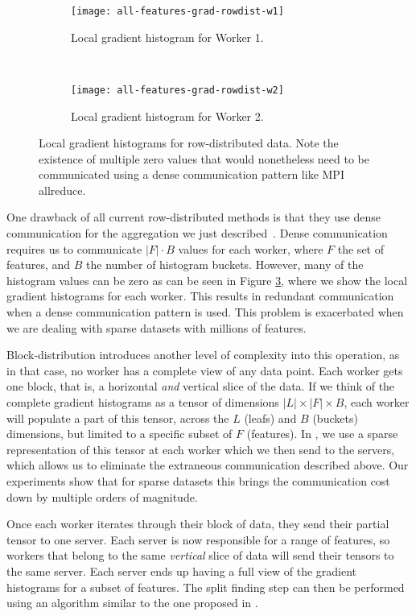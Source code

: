 \begin{figure}
	\centering
	\begin{subfigure}[t]{\textwidth}
		\centering
		\texttt{[image: all-features-grad-rowdist-w1]}
		\caption{Local gradient histogram for Worker 1.}
		\label{fig:grad-row-dist-w1}
	\end{subfigure}
	\\
	\begin{subfigure}[t]{\textwidth}
		\centering
		\texttt{[image: all-features-grad-rowdist-w2]}
		\caption{Local gradient histogram for Worker 2.}
		\label{fig:grad-row-dist-w2}
	\end{subfigure}
	\caption{Local gradient histograms for row-distributed data. Note the existence of multiple
	zero values that would nonetheless need to be communicated using a dense communication pattern like
	MPI allreduce.}
	\label{fig:grad-row-dist}
\end{figure}


One drawback of all current row-distributed methods is that they use dense communication
for the aggregation we just described~\cite{xgboost, lightgbm, catboost, dimboost}. Dense communication
requires us to communicate $|F| \cdot B$ values for each worker, where $F$ the set of features,
and $B$ the number of histogram buckets. However,
many of the histogram values can be zero as can be seen in Figure \ref{fig:grad-row-dist}, where we show
the local gradient histograms for each worker. This results in redundant communication when
a dense communication pattern is used. This problem is exacerbated when we are dealing with sparse
datasets with millions of features.

Block-distribution introduces another level of complexity into this operation, as
in that case, no worker has a complete view of any data point. Each worker gets one block,
that is, a horizontal \emph{and} vertical slice of the data. If we think of the complete
gradient histograms as a tensor of dimensions $|L| \times |F| \times B$, each worker
will populate a part of this tensor, across the $L$ (leafs) and $B$ (buckets) dimensions, but limited to a specific
subset of $F$ (features). In \blockgbt, we use a sparse representation of this tensor at each worker
which we then send to the servers, which allows
us to eliminate the extraneous communication described above. Our experiments show
that for sparse datasets this brings the communication cost down by multiple orders
of magnitude.

Once each worker iterates
through their block of data, they send their partial tensor to one server. Each server
is now responsible for a range of features, so workers that belong to the same \emph{vertical}
slice of data will send their tensors to the same server. Each server ends up having
a full view of the gradient histograms for a subset of features. The split finding step
can then be performed using an algorithm similar to the one proposed in \citet{dimboost}.


